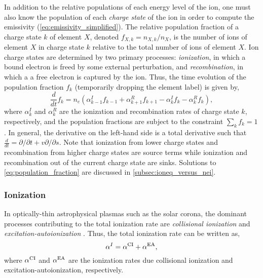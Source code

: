 In addition to the relative populations of each energy level of the ion, one must also know the population of each \textit{charge state} of the ion in order to compute the emissivity (\autoref{eq:emissivity_simplified}). The relative population fraction of a charge state $k$ of element $X$, denoted $f_{X,k}=n_{X,k}/n_X$, is the number of ions of element $X$ in charge state $k$ relative to the total number of ions of element $X$. Ion charge states are determined by two primary processes: \textit{ionization}, in which a bound electron is freed by some external perturbation, and \textit{recombination}, in which a a free electron is captured by the ion. Thus, the time evolution of the population fraction $f_k$ (temporarily dropping the element label) is given by,
\begin{equation}\label{eq:population_fraction}
    \frac{d}{dt}f_k = n_e(\alpha_{k-1}^I f_{k-1} + \alpha_{k+1}^R f_{k+1} - \alpha_{k}^I f_k - \alpha_k^R f_k),
\end{equation}
where $\alpha_k^I$ and $\alpha_k^R$ are the ionization and recombination rates of charge state $k$, respectively, and the population fractions are subject to the constraint $\sum_kf_k=1$ \citep{del_zanna_solar_2018}. In general, the derivative on the left-hand side is a total derivative such that $\frac{d}{dt}=\partial/\partial t + v\partial/\partial s$. Note that ionization from lower charge states and recombination from higher charge states are source terms while ionization and recombination out of the current charge state are sinks. Solutions to \autoref{eq:population_fraction} are discussed in \autoref{subsec:ioneq_versus_nei}.

\subsubsection{Ionization}

In optically-thin astrophysical plasmas such as the solar corona, the dominant processes contributing to the total ionization rate are \textit{collisional ionization} and \textit{excitation-autoionization} \citep{bradshaw_collisional_2013}. Thus, the total ionization rate can be written as,
\begin{equation}\label{eq:total_ionization_rate}
    \alpha^I = \alpha^\textup{CI} + \alpha^\textup{EA},
\end{equation}
where $\alpha^\textup{CI}$ and $\alpha^\textup{EA}$ are the ionization rates due collisional ionization and excitation-autoionization, respectively. 

